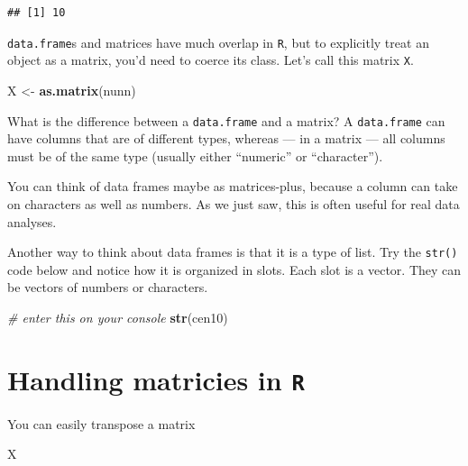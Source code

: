 \documentclass[
]{book}
\newenvironment{Shaded}{\begin{snugshade}}{\end{snugshade}}
\newcommand{\CommentTok}[1]{\textcolor[rgb]{0.56,0.35,0.01}{\textit{#1}}}
\newcommand{\KeywordTok}[1]{\textcolor[rgb]{0.13,0.29,0.53}{\textbf{#1}}}
\newcommand{\NormalTok}[1]{#1}
\newcommand{\StringTok}[1]{\textcolor[rgb]{0.31,0.60,0.02}{#1}}
\theoremstyle{definition}
\theoremstyle{definition}
\theoremstyle{definition}
\theoremstyle{remark}
\begin{document}
\begin{verbatim}
## [1] 10
\end{verbatim}

\texttt{data.frame}s and matrices have much overlap in \texttt{R}, but to explicitly treat an object as a matrix, you'd need to coerce its class. Let's call this matrix \texttt{X}.

\begin{Shaded}
\begin{Highlighting}[]
\NormalTok{X <{-}}\StringTok{ }\KeywordTok{as.matrix}\NormalTok{(nunn)}
\end{Highlighting}
\end{Shaded}

What is the difference between a \texttt{data.frame} and a matrix? A \texttt{data.frame} can have columns that are of different types, whereas --- in a matrix --- all columns must be of the same type (usually either ``numeric'' or ``character'').

You can think of data frames maybe as matrices-plus, because a column can take on characters as well as numbers. As we just saw, this is often useful for real data analyses.

Another way to think about data frames is that it is a type of list. Try the \texttt{str()} code below and notice how it is organized in slots. Each slot is a vector. They can be vectors of numbers or characters.

\begin{Shaded}
\begin{Highlighting}[]
\CommentTok{\# enter this on your console}
\KeywordTok{str}\NormalTok{(cen10)}
\end{Highlighting}
\end{Shaded}

\hypertarget{handling-matricies-in-r}{%
\section{\texorpdfstring{Handling matricies in \texttt{R}}{Handling matricies in R}}\label{handling-matricies-in-r}}

You can easily transpose a matrix

\begin{Shaded}
\begin{Highlighting}[]
\NormalTok{X}
\end{Highlighting}
\end{Shaded}
\end{document}
